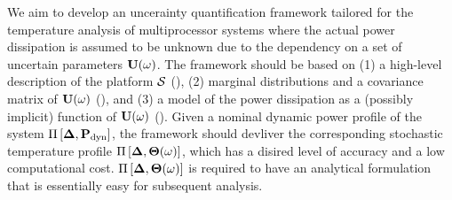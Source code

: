 We aim to develop an uncerainty quantification framework tailored for the temperature analysis of multiprocessor systems where the actual power dissipation is assumed to be unknown due to the dependency on a set of uncertain parameters $\mathbf{U}(\omega)$. The framework should be based on (1) a high-level description of the platform $\mathcal{S}$ (), (2) marginal distributions and a covariance matrix of $\mathbf{U}(\omega)$ (), and (3) a model of the power dissipation as a (possibly implicit) function of $\mathbf{U}(\omega)$ (). Given a nominal dynamic power profile of the system $\prof{\mP_\dyn}$, the framework should devliver the corresponding stochastic temperature profile $\Pi\left[\boldsymbol{\Delta}, {\boldsymbol\Theta}(\omega)\right]$, which has a disired level of accuracy and a low computational cost. $\Pi\left[\boldsymbol{\Delta}, {\boldsymbol\Theta}(\omega)\right]$ is required to have an analytical formulation that is essentially easy for subsequent analysis.
